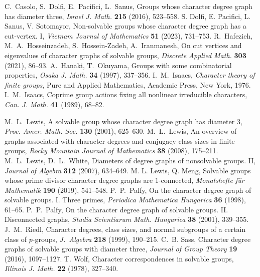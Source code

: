 \documentclass{amsart}
\begin{document}
C.~Casolo, S.~Dolfi, E.~Pacifici, L.~Sanus, Groups whose character degree graph has diameter three, \textit{Israel J. Math.} \textbf{215} (2016), 523--558.
S. Dolfi, E. Pacifici, L. Sanus, V. Sotomayor, Non-solvable groups whose character degree graph has a cut-vertex. I,
  \textit{Vietnam Journal of Mathematics} \textbf{51} (2023), 731--753.
R.~Hafezieh, M.~A.~Hosseinzadeh, S.~Hossein-Zadeh, A.~Iranmanesh, On cut vertices and eigenvalues of character graphs of solvable groups, \textit{Discrete Applied Math.} \textbf{303} (2021), 86--93.
A.~Hanaki, T.~Okuyama,  Groups with some combinatorial properties, \textit{Osaka J. Math.} \textbf{34} (1997), 337--356.
I.~M.~Isaacs, \textit{Character theory of finite groups}, Pure and Applied Mathematics, Academic Press, New York, 1976.
I.~M.~Isaacs, Coprime group actions fixing all nonlinear irreducible characters, \textit{Can. J. Math.} \textbf{41} (1989), 68--82.

M.~L.~Lewis, A solvable group whose character degree graph has diameter $3$, \textit{Proc. Amer. Math. Soc.} \textbf{130} (2001), 625--630.	
M.~L.~Lewis, An overview of graphs associated with character degrees and conjugacy
  class sizes in finite groups, \textit{Rocky Mountain Journal of Mathematics} \textbf{38} (2008), 175--211.
M.~L.~Lewis, D.~L.~White, Diameters of degree graphs of nonsolvable groups. II, \textit{Journal of Algebra} \textbf{312} (2007), 634--649.
 M. L. Lewis, Q. Meng, Solvable groups whose prime divisor character degree graphs are $1$-connected, \textit{Monatshefte f\"ur Mathematik} \textbf{190} (2019), 541--548.
P.~P.~Palfy, On the character degree graph of solvable groups. I. Three primes, \textit{Periodica Mathematica Hungarica} \textbf{36} (1998), 61--65.	
P.~P.~Palfy, On the character degree graph of solvable groups. II. Disconnected graphs, \textit{Studia Scientiarum Math. Hungarica} \textbf{38} (2001), 339--355.
J.~M.~Riedl, Character degrees, class sizes, and normal subgroups of a certain class of $p$-groups, \textit{J.~Algebra} \textbf{218} (1999), 190--215.
C.~B. Sass, Character degree graphs of solvable groups with diameter three, \textit{Journal of Group Theory}  \textbf{19} (2016), 1097--1127.
 T. Wolf, Character correspondences in solvable groups, \textit{Illinois J. Math.} \textbf{22} (1978), 327--340.
\end{document}
